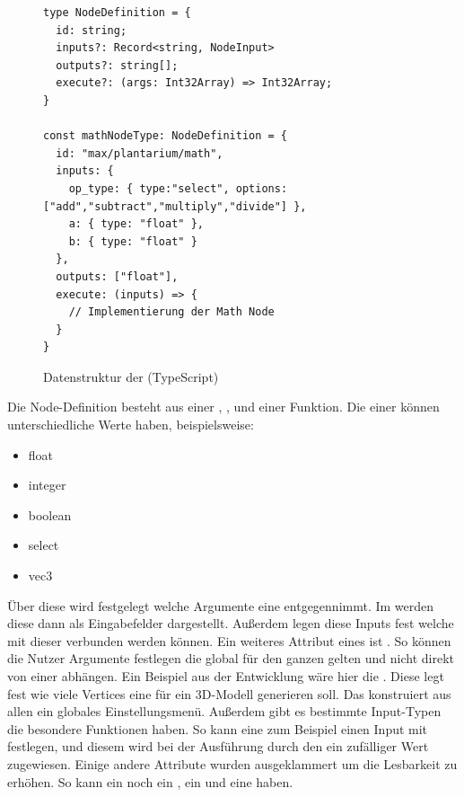 \documentclass[ngerman]{article}
\begin{document}
\begin{figure}[htbp]
  \begin{code}
    \begin{verbatim}
type NodeDefinition = {
  id: string;
  inputs?: Record<string, NodeInput>
  outputs?: string[];
  execute?: (args: Int32Array) => Int32Array;
}

const mathNodeType: NodeDefinition = {
  id: "max/plantarium/math",
  inputs: { 
    op_type: { type:"select", options: ["add","subtract","multiply","divide"] }, 
    a: { type: "float" }, 
    b: { type: "float" } 
  },
  outputs: ["float"],
  execute: (inputs) => {
    // Implementierung der Math Node
  }
}
    \end{verbatim}
  \end{code}

  \caption{Datenstruktur der  (TypeScript)}
  \label{sec:data_node_type}

\end{figure}

Die Node-Definition besteht aus einer , ,  und einer  Funktion. Die  einer  können unterschiedliche  Werte haben, beispielsweise:

\begin{itemize}
  \setlength\itemsep{0.0em}
  \item float
  \item integer
  \item boolean
  \item select
  \item vec3
\end{itemize}

Über diese  wird festgelegt welche Argumente eine  entgegennimmt.
Im  werden diese dann als Eingabefelder dargestellt. Außerdem legen diese Inputs fest welche  mit dieser  verbunden werden können. 
\br
Ein weiteres Attribut eines  ist . So können die Nutzer Argumente festlegen die global für den ganzen  gelten und nicht direkt von einer  abhängen. Ein Beispiel aus der Entwicklung wäre hier die . Diese legt fest wie viele Vertices eine  für ein 3D-Modell generieren soll. Das  konstruiert aus allen  ein globales Einstellungsmenü.
\br
Außerdem gibt es bestimmte Input-Typen die besondere Funktionen haben. So kann eine  zum Beispiel einen Input mit  festlegen, und diesem wird bei der Ausführung durch den  ein zufälliger Wert zugewiesen.
\br
Einige andere Attribute wurden ausgeklammert um die Lesbarkeit zu erhöhen. So kann ein  noch ein , ein  und eine  haben.
\end{document}
